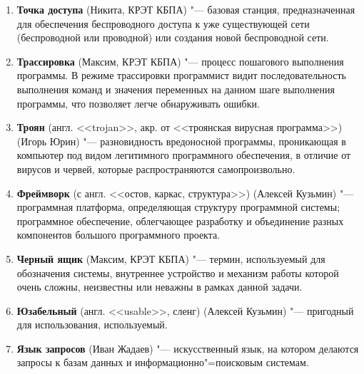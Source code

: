 \documentclass[12pt]{article}
\begin{document}
\begin{enumerate}
    \item \textbf{Точка доступа} (Никита, КРЭТ КБПА) "--- базовая станция, предназначенная для обеспечения беспроводного доступа к уже существующей сети (беспроводной или проводной) или создания новой беспроводной сети.

    \item \textbf{Трассировка} (Максим, КРЭТ КБПА) "--- процесс пошагового выполнения программы. В режиме трассировки программист видит последовательность выполнения команд и значения переменных на данном шаге выполнения программы, что позволяет легче обнаруживать ошибки.

    \item \textbf{Троян} (англ. <<trojan>>, акр. от <<троянская вирусная программа>>) (Игорь Юрин) "--- разновидность вредоносной программы, проникающая в компьютер под видом легитимного программного обеспечения, в отличие от вирусов и червей, которые распространяются самопроизвольно.

    \item \textbf{Фреймворк} (с англ. <<остов, каркас, структура>>) (Алексей Кузьмин) "---  программная платформа, определяющая структуру программной системы; программное обеспечение, облегчающее разработку и объединение разных компонентов большого программного проекта.

    \item \textbf{Черный ящик} (Максим, КРЭТ КБПА) "--- термин, используемый для обозначения системы, внутреннее устройство и механизм работы которой очень сложны, неизвестны или неважны в рамках данной задачи. 

    \item \textbf{Юзабельный} (англ. <<usable>>, сленг) (Алексей Кузьмин) "--- пригодный для использования, используемый.

    \item \textbf{Язык запросов} (Иван Жадаев) "--- искусственный язык, на котором делаются запросы к базам данных и информационно"=поисковым системам.
\end{enumerate}
\end{document}
